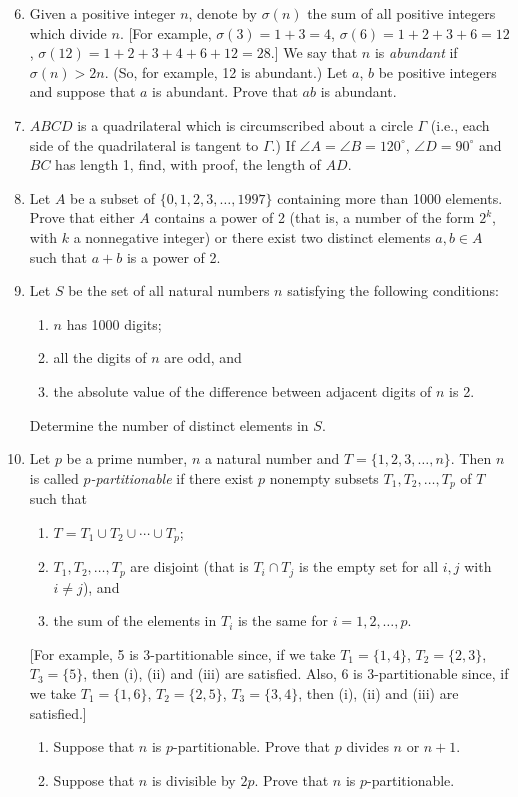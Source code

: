 \documentclass[12pt]{article}
\begin{document}
\begin{enumerate}
\setcounter{enumi}{5}
\item Given a positive integer $n$, denote by $\sigma(n)$ the sum of all positive integers which divide $n$. [For example, $\sigma(3) = 1 + 3 = 4$, $\sigma(6) = 1 + 2 + 3 + 6 = 12$, $\sigma(12) = 1 + 2 + 3 + 4 + 6 + 12 = 28$.]
We say that $n$ is \textit{abundant} if $\sigma(n) > 2n$. (So, for example, 12 is abundant.)
Let $a$, $b$ be positive integers and suppose that $a$ is abundant. Prove that $ab$ is abundant.

\item $ABCD$ is a quadrilateral which is circumscribed about a circle $\Gamma$ (i.e., each side of the quadrilateral is tangent to $\Gamma$.) If $\angle A = \angle B = 120^\circ$, $\angle D = 90^\circ$ and $BC$ has length 1, find, with proof, the length of $AD$.

\item Let $A$ be a subset of $\{0, 1, 2, 3, \ldots, 1997\}$ containing more than 1000 elements. Prove that either $A$ contains a power of 2 (that is, a number of the form $2^k$, with $k$ a nonnegative integer) or there exist two distinct elements $a, b \in A$ such that $a + b$ is a power of 2.

\item Let $S$ be the set of all natural numbers $n$ satisfying the following conditions:
\begin{enumerate}
\item[(i)] $n$ has 1000 digits;
\item[(ii)] all the digits of $n$ are odd, and
\item[(iii)] the absolute value of the difference between adjacent digits of $n$ is 2.
\end{enumerate}
Determine the number of distinct elements in $S$.

\item Let $p$ be a prime number, $n$ a natural number and $T = \{1, 2, 3, \ldots, n\}$. Then $n$ is called \textit{$p$-partitionable} if there exist $p$ nonempty subsets $T_1, T_2, \ldots, T_p$ of $T$ such that
\begin{enumerate}
\item[(i)] $T = T_1 \cup T_2 \cup \cdots \cup T_p$;
\item[(ii)] $T_1, T_2, \ldots, T_p$ are disjoint (that is $T_i \cap T_j$ is the empty set for all $i, j$ with $i \neq j$), and
\item[(iii)] the sum of the elements in $T_i$ is the same for $i = 1, 2, \ldots, p$.
\end{enumerate}
[For example, 5 is 3-partitionable since, if we take $T_1 = \{1, 4\}$, $T_2 = \{2, 3\}$, $T_3 = \{5\}$, then (i), (ii) and (iii) are satisfied. Also, 6 is 3-partitionable since, if we take $T_1 = \{1, 6\}$, $T_2 = \{2, 5\}$, $T_3 = \{3, 4\}$, then (i), (ii) and (iii) are satisfied.]
\begin{enumerate}
\item[(a)] Suppose that $n$ is $p$-partitionable. Prove that $p$ divides $n$ or $n + 1$.
\item[(b)] Suppose that $n$ is divisible by $2p$. Prove that $n$ is $p$-partitionable.
\end{enumerate}

\end{enumerate}
\end{document}
